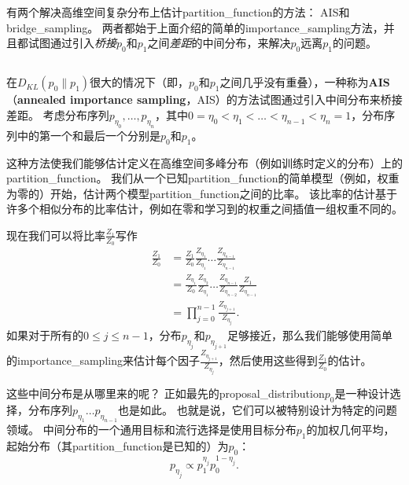 
有两个解决高维空间复杂分布上估计\gls{partition_function}的方法：
\gls{AIS}和\gls{bridge_sampling}。
两者都始于上面介绍的简单的\gls{importance_sampling}方法，并且都试图通过引入\emph{桥接}$p_0$和$p_1$之间\emph{差距}的中间分布，来解决$p_0$远离$p_1$的问题。


\subsection{}
\label{sec:annealed_importance_sampling}
在$D_{KL}(p_0 \| p_1)$很大的情况下（即，$p_0$和$p_1$之间几乎没有重叠），一种称为\textbf{\gls{AIS}}（\textbf{annealed importance sampling}，AIS）的方法试图通过引入中间分布来桥接差距\citep{Jarzynski1997,Neal-2001}。
考虑分布序列$p_{\eta_0},\dots,p_{\eta_n}$，其中$0=\eta_0 < \eta_1 < \dots < \eta_{n-1} < \eta_n = 1$，分布序列中的第一个和最后一个分别是$p_0$和$p_1$。


这种方法使我们能够估计定义在高维空间多峰分布（例如训练时定义的分布）上的\gls{partition_function}。
我们从一个已知\gls{partition_function}的简单模型（例如，权重为零的）开始，估计两个模型\gls{partition_function}之间的比率。
该比率的估计基于许多个相似分布的比率估计，例如在零和学习到的权重之间插值一组权重不同的。


现在我们可以将比率$\frac{Z_1}{Z_0}$写作
\begin{align}
\frac{Z_1}{Z_0} &= \frac{Z_1}{Z_0} \frac{Z_{\eta_1}}{Z_{\eta_1}} \dots \frac{Z_{\eta_{n-1}}}{Z_{\eta_{n-1}}} \\
&= \frac{Z_{\eta_1}}{Z_{0}}  \frac{Z_{\eta_2}}{Z_{\eta_1}}  \dots \frac{Z_{\eta_{n-1}}}{Z_{\eta_{n-2}}} \frac{Z_{1}}{Z_{\eta_{n-1}}} \\
&= \prod_{j=0}^{n-1} \frac{ Z_{\eta_{j+1}} }{Z_{\eta_j}}. \label{eq:18.49}
\end{align}
如果对于所有的$0 \leq j \leq n-1$，分布$p_{\eta_j}$和$p_{\eta_{j+1}}$足够接近，那么我们能够使用简单的\gls{importance_sampling}来估计每个因子$\frac{Z_{\eta_{j+1}}}{ Z_{\eta_j}}$，然后使用这些得到$\frac{Z_1}{Z_0}$的估计。


这些中间分布是从哪里来的呢？
正如最先的\gls{proposal_distribution}$p_0$是一种设计选择，分布序列$p_{\eta_1} \dots p_{\eta_{n-1}}$也是如此。
也就是说，它们可以被特别设计为特定的问题领域。
中间分布的一个通用目标和流行选择是使用目标分布$p_1$的加权几何平均，起始分布（其\gls{partition_function}是已知的）为$p_0$：
\begin{equation}
	p_{\eta_j} \propto p_1^{\eta_j} p_0^{1-\eta_j}.
\end{equation}


